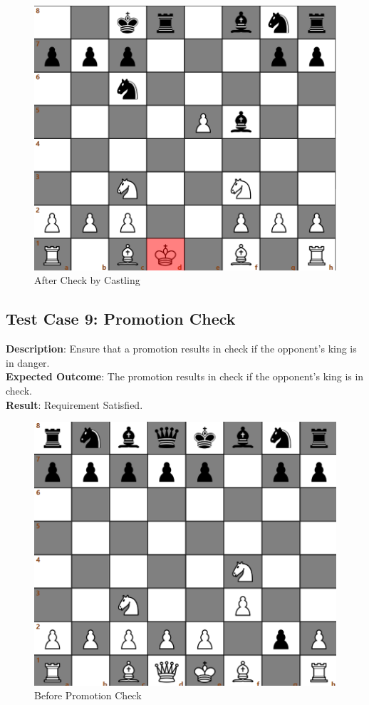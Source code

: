 \documentclass[a4paper,12pt]{article}
\begin{document}
\begin{figure}[H]
    \centering
    \includegraphics[width=0.7\linewidth]{Images/Test Cases/testCase8Img2.png}
    \caption{After Check by Castling}
    \label{fig:AfterCheckByCastling}
\end{figure}

\subsection{Test Case 9: Promotion Check}
\textbf{Description}: Ensure that a promotion results in check if the opponent's king is in danger.\\
\textbf{Expected Outcome}: The promotion results in check if the opponent's king is in check.\\
\textbf{Result}: Requirement Satisfied.

\begin{figure}[H]
    \centering
    \includegraphics[width=0.7\linewidth]{Images/Test Cases/testCase9Img1.png}
    \caption{Before Promotion Check}
    \label{fig:BeforePromotionCheck}
\end{figure}
\end{document}
